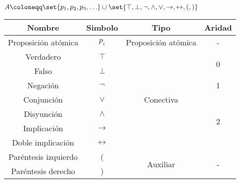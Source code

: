 \begin{definition}
	\(A \coloneqq \set{p_1, p_2, p_3, \ldots} \cup \set{\top, \perp, \neg, \wedge, \vee, \rightarrow, \leftrightarrow, (,)}\)
\end{definition}
\begin{table}[]
	\centering
	\begin{tabular}{|c|c|c|c|}
		\hline
		\textbf{Nombre}      & \textbf{Simbolo}    & \textbf{Tipo}              & \textbf{Aridad}    \\ \hline
		Proposición atómica  & \(p_i\)             & Proposición atómica        & -                  \\ \hline
		Verdadero            & \(\top\)            & \multirow{7}{*}{Conectiva} & \multirow{2}{*}{0} \\ \cline{1-2}
		Falso                & \(\perp\)           &                            &                    \\ \cline{1-2} \cline{4-4}
		Negación             & \(\neg\)            &                            & 1                  \\ \cline{1-2} \cline{4-4}
		Conjunción           & \(\vee\)            &                            & \multirow{4}{*}{2} \\ \cline{1-2}
		Disyunción           & \(\wedge\)          &                            &                    \\ \cline{1-2}
		Implicación          & \(\rightarrow\)     &                            &                    \\ \cline{1-2}
		Doble implicación    & \(\leftrightarrow\) &                            &                    \\ \hline
		Paréntesis izquierdo & (                   & \multirow{2}{*}{Auxiliar}  & \multirow{2}{*}{-} \\ \cline{1-2}
		Paréntesis derecho   & )                   &                            &                    \\ \hline
	\end{tabular}
\end{table}

